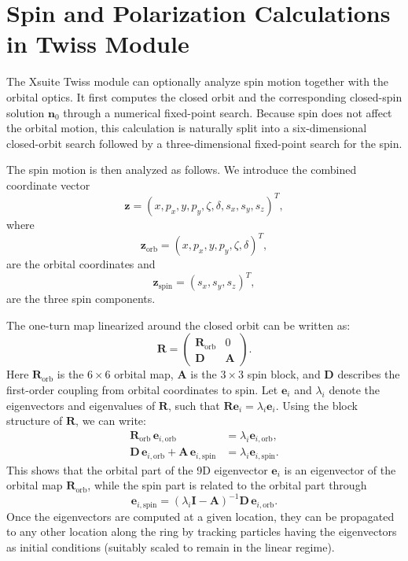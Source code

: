\documentclass[a4paper,
               biblatex,     %
               hyphens,      %
               ]{jacow}
\begin{document}
\section{Spin and Polarization Calculations in Twiss Module}

The Xsuite Twiss module can optionally analyze spin motion together with the orbital optics. It first computes the closed orbit and the corresponding closed-spin solution $\bm{n}_0$ through a numerical fixed-point search. Because spin does not affect the orbital motion, this calculation is naturally split into a six-dimensional closed-orbit search followed by a three-dimensional fixed-point search for the spin. 

The spin motion is then analyzed as follows.
We introduce the combined coordinate vector
\begin{equation}
\bm{z} = (x, p_x, y, p_y, \zeta, \delta, s_x, s_y, s_z)^T,
\end{equation}
where
\begin{equation}
\bm{z}_{\mathrm{orb}} = (x, p_x, y, p_y, \zeta, \delta)^T,
\end{equation}
are the orbital coordinates and
\begin{equation}
\bm{z}_{\mathrm{spin}} = (s_x, s_y, s_z)^T,
\end{equation}
are the three spin components.

The one-turn map linearized around the closed orbit can be written as:
\begin{equation}
\mathbf{R} =
\begin{pmatrix}
\mathbf{R}_{\mathrm{orb}} & 0 \\
\mathbf{D} & \mathbf{A}
\end{pmatrix}.
\label{eq:linear_map}
\end{equation}
Here $\mathbf{R}_{\mathrm{orb}}$ is the $6\times6$ orbital map, $\mathbf{A}$ is the $3\times3$ spin block, and $\mathbf{D}$ describes the first-order coupling from orbital coordinates to spin. Let $\bm{e}_i$ and $\lambda_i$ denote the eigenvectors and eigenvalues of $\mathbf{R}$, such that $\mathbf{R}\bm{e}_i = \lambda_i\bm{e}_i$. 
Using the block structure of $\mathbf{R}$, we can write:
\begin{align}
\mathbf{R}_{\mathrm{orb}}\,\bm{e}_{i,\mathrm{orb}} &= \lambda_i\bm{e}_{i,\mathrm{orb}},
\label{eq:orbital_eigenmode}\\
\mathbf{D}\,\bm{e}_{i,\mathrm{orb}} + \mathbf{A}\,\bm{e}_{i,\mathrm{spin}} &= \lambda_i\bm{e}_{i,\mathrm{spin}}.
\label{eq:spin_block_relation}
\end{align}
This shows that the orbital part of the 9D eigenvector $\bm{e}_i$ is an eigenvector of the orbital map $\mathbf{R}_{\mathrm{orb}}$, while the spin part is related to the orbital part through
\begin{equation}
\bm{e}_{i,\mathrm{spin}} = (\lambda_i\mathbf{I} - \mathbf{A})^{-1}
\mathbf{D}\,\bm{e}_{i,\mathrm{orb}}.
\label{eq:spin_from_orbital_mode}
\end{equation}
Once the eigenvectors are computed at a given location, they can be propagated to any other location along the ring by tracking particles having the eigenvectors as initial conditions (suitably scaled to remain in the linear regime).
\end{document}
